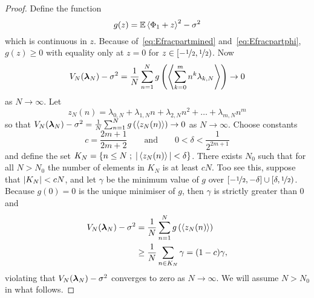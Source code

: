 \documentclass[journal]{IEEEtran}
\begin{document}
\begin{proof}
Define the function
\begin{equation}\label{eq:gz}
g(z) = \expect\fracpart{\Phi_1 + z}^2 - \sigma^2
\end{equation}
which is continuous in $z$. Because of~\eqref{eq:Efracpartmined} and~\eqref{eq:Efracpartphi}, $g(z) \geq 0$ with equality only at $z = 0$ for $z \in [-\nicefrac{1}{2}, \nicefrac{1}{2})$. Now
\[
V_N(\boldsymbol{\lambda}_N) - \sigma^2 = \frac{1}{N}\sum_{n=1}^{N} g\left( \left\langle  \sum_{k=0}^{m}{n^k \lambda_{k,N}}  \right\rangle \right) \rightarrow 0
\]
as $N \rightarrow \infty$. Let
\[
z_N(n) = \lambda_{0,N} + \lambda_{1,N} n + \lambda_{2,N} n^2 + \dots + \lambda_{m,N} n^m
\]
so that $V_N(\boldsymbol{\lambda}_N) - \sigma^2 = \frac{1}{N}\sum_{n=1}^{N} g\left( \left\langle z_N(n) \right\rangle \right) \rightarrow 0$ as $N \rightarrow \infty$.
Choose constants 
\[
c = \frac{2m+1}{2m+2} \qquad \text{and} \qquad 0 < \delta < \frac{1}{2^{2m+1}}
\]
and define the set $K_{N}=\left\{  n\leq N \; ; \; \vert \left\langle z_N(n) \right\rangle \vert < \delta \right\}$.  There exists $N_0$ such that for all $N > N_0$ the number of elements in $K_N$ is at least $cN$.  Too see this, suppose that $\vert K_N \vert < cN$, and let $\gamma$ be the minimum value of $g$ over $[-\nicefrac{1}{2},-\delta] \cup [\delta, \nicefrac{1}{2})$. Because $g(0) = 0$ is the unique minimiser of $g$, then $\gamma$ is strictly greater than $0$ and
\begin{align*}
V_N(\boldsymbol{\lambda}_N) - \sigma^2 &= \frac{1}{N}\sum_{n=1}^{N} g\left( \left\langle z_N(n) \right\rangle \right) \\
&\geq \frac{1}{N}\sum_{n\in K_N} \gamma = (1-c)\gamma,
\end{align*}
violating that $V_N(\boldsymbol{\lambda}_N) - \sigma^2$ converges to zero as $N \rightarrow \infty$.  We will assume $N > N_0$ in what follows.


\end{proof}
\end{document}
